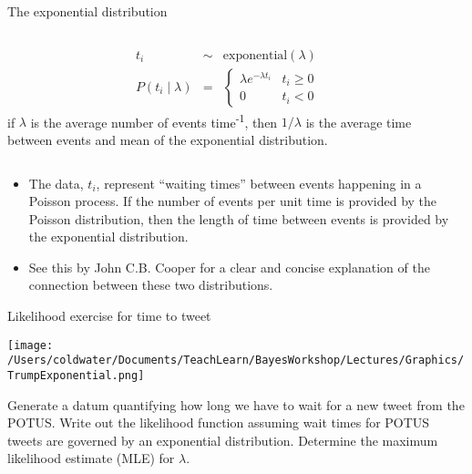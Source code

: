 \documentclass[ignorenonframetext,]{beamer}
\providecommand{\tightlist}{%
  \setlength{\itemsep}{0pt}\setlength{\parskip}{0pt}}
\begin{document}
\begin{frame}{The exponential distribution}

\begin{columns}[T] %
\begin{column}[T]{5cm} %
\begin{eqnarray}
t_{i} & \sim & \textrm{exponential}(\lambda)\nonumber\\
P(t_{i} \mid \lambda) & = &
\begin{cases}
\lambda e^{-\lambda t_{i}} & t_{i} \geq 0 \nonumber\\
0 & t_{i} < 0
\end{cases}
\end{eqnarray}
if $\lambda$ is the average number of events time\textsuperscript{-1}, then $1/\lambda$ is the average time between events and mean of the exponential distribution.
\end{column}

\begin{column}[T]{6cm} 



\begin{center}

\end{center}

\end{column}
\end{columns}

\begin{itemize}
\tightlist
\item
  The data, \(t_{i}\), represent ``waiting times'' between events
  happening in a Poisson process. If the number of events per unit time
  is provided by the Poisson distribution, then the length of time
  between events is provided by the exponential distribution.
\item
  See this
  \href{https://neurophysics.ucsd.edu/courses/physics_171/exponential.pdf}{}
  by John C.B. Cooper for a clear and concise explanation of the
  connection between these two distributions.
\end{itemize}

\end{frame}

\begin{frame}{Likelihood exercise for time to tweet}

\centerline{\texttt{[image: /Users/coldwater/Documents/TeachLearn/BayesWorkshop/Lectures/Graphics/TrumpExponential.png]}}

Generate a datum quantifying how long we have to wait for a new tweet
from the POTUS. Write out the likelihood function assuming wait times
for POTUS tweets are governed by an exponential distribution. Determine
the maximum likelihood estimate (MLE) for \(\lambda\).

\end{frame}
\end{document}
